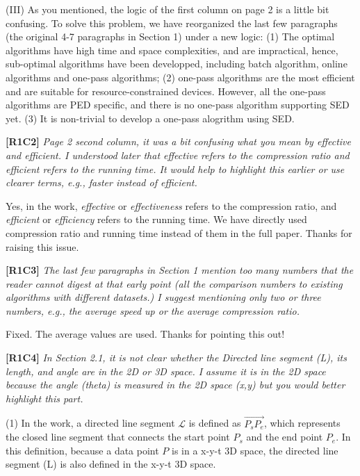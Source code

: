 \documentclass{letter}
\newcommand{\vv}{\overrightarrow}
\begin{document}
(III) As you mentioned, the logic of the first column on page 2 is a little bit confusing. To solve this problem, we have reorganized the last few paragraphs (the original 4-7 paragraphs in Section 1) under a new logic:  (1) The optimal algorithms have high time and space complexities, and are impractical, hence, sub-optimal algorithms have been developped, including batch algorithm, online algorithms and one-pass algorithms; (2) one-pass algorithms are the most efficient and are suitable for resource-constrained devices. However, all the one-pass algorithms are PED specific, and there is no one-pass algorithm supporting SED yet. 
(3) It is non-trivial to develop a one-pass alogrithm using SED.


\textbf{[R1C2]} \emph{Page 2 second column, it was a bit confusing what you mean by effective and efficient. I understood later that effective refers to the compression ratio and efficient refers to the running time. It would help to highlight this earlier or use clearer terms, e.g., faster instead of efficient.}

Yes, in the work, \emph{effective} or \emph{effectiveness} refers to the compression ratio, and \emph{efficient} or \emph{efficiency} refers to the running time. We have directly used compression ratio and running time instead of them in the full paper. Thanks for raising this issue.


\textbf{[R1C3]} \emph{The last few paragraphs in Section 1 mention too many numbers that the reader cannot digest at that early point (all the comparison numbers to existing algorithms with different datasets.) I suggest mentioning only two or three numbers, e.g., the average speed up or the average compression ratio.}

Fixed. The average values are used. Thanks for pointing this out!

\textbf{[R1C4]} \emph{In Section 2.1, it is not clear whether the Directed line segment (L), its length, and angle are in the 2D or 3D space. I assume it is in the 2D space because the angle (theta) is measured in the 2D space (x,y) but you would better highlight this part.}

(1) In the work, a directed line segment $\mathcal{L}$ is defined as $\vv{P_{s}P_{e}}$, which represents the closed line segment that connects the start point $P_s$ and the end point $P_e$. In this definition, because a data point $P$ is in a x-y-t 3D space, the directed line segment (L) is also defined in the x-y-t 3D space.
\end{document}

